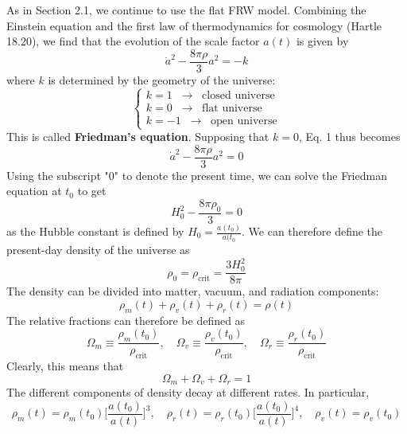 \documentclass{article}
\newcommand{\thus}[0]{\; \; \longrightarrow \; \;}
\begin{document}
As in Section 2.1, we continue to use the flat FRW model. Combining the Einstein equation and the first law of thermodynamics for cosmology (Hartle 18.20), we find that the evolution of the scale factor $a(t)$ is given by 
\begin{equation}
    \dot{a}^2 - \frac{8 \pi \rho}{3} a^2 = -k
\end{equation}
where $k$ is determined by the geometry of the universe: 
\begin{equation}
    \begin{cases}
    k = 1 \thus \text{closed universe} \\
    k = 0 \thus \text{flat universe} \\
    k = -1 \thus \text{open universe}
    \end{cases}
\end{equation}
This is called \textbf{Friedman's equation}. Supposing that $k=0$, Eq. 1 thus becomes
\begin{equation}
    \dot{a}^2 - \frac{8\pi \rho}{3} a^2 = 0
\end{equation}
Using the subscript "0" to denote the present time, we can solve the Friedman equation at $t_0$ to get
\begin{equation}
    H_0^2 - \frac{8 \pi \rho_0}{3} = 0
\end{equation}
as the Hubble constant is defined by $H_0 = \frac{\dot{a}(t_0)}{a(t_0}$. We can therefore define the present-day density of the universe as 
\begin{equation}
    \rho_0 = \rho_\text{crit} = \frac{3H_0^2}{8 \pi} 
\end{equation}
The density can be divided into matter, vacuum, and radiation components: 
\begin{equation}
    \rho_m(t) + \rho_v(t) + \rho_r(t) = \rho(t)
\end{equation}
The relative fractions can therefore be defined as 
\begin{equation}
    \Omega_m \equiv \frac{\rho_m(t_0)}{\rho_\text{crit}}, \quad \Omega_v \equiv \frac{\rho_v(t_0)}{\rho_\text{crit}}, \quad \Omega_r \equiv \frac{\rho_r(t_0)}{\rho_\text{crit}}
\end{equation}
Clearly, this means that 
\begin{equation}
    \Omega_m + \Omega_v + \Omega_r = 1
\end{equation}
The different components of density decay at different rates. In particular, 
\begin{equation}
    \rho_m(t) = \rho_m(t_0) \Big[ \frac{a(t_0)}{a(t)} \Big]^3, \quad \rho_r(t) = \rho_r(t_0) \Big[ \frac{a(t_0)}{a(t)} \Big]^4, \quad \rho_v(t) = \rho_v(t_0)
\end{equation}
\end{document}
